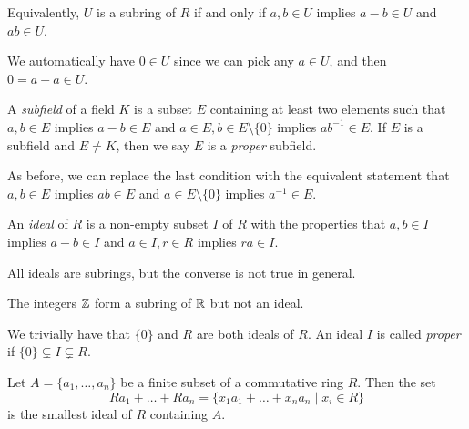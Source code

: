 \begin{remark}
  Equivalently, $U$ is a subring of $R$ if and only
  if $a, b \in U$ implies $a - b \in U$ and $ab \in U$.
\end{remark}

\begin{remark}
  We automatically have $0 \in U$ since we can pick
  any $a \in U$, and then $0 = a - a \in U$.
\end{remark}

\begin{definition}[Subfield]
  A \emph{subfield} of a field $K$ is a subset $E$
  containing at least two elements such that
  $a, b \in E$ implies $a - b \in E$ and $a \in E, b \in E \setminus \{0\}$ implies $ab^{-1} \in E$. If $E$ is
  a subfield and $E \ne K$, then we say $E$ is a
  \emph{proper} subfield.
\end{definition}

\begin{remark}
  As before, we can replace the last condition with
  the equivalent statement that
  $a, b \in E$ implies $ab \in E$ and
  $a \in E \setminus \{0\}$ implies $a^{-1} \in E$.
\end{remark}

\begin{definition}[Ideal]
  An \emph{ideal} of $R$ is a non-empty subset $I$ of
  $R$ with the properties that $a, b \in I$ implies
  $a - b \in I$ and $a \in I, r \in R$ implies $ra \in I$.
\end{definition}

\begin{remark}
  All ideals are subrings, but the converse is not
  true in general.
\end{remark}

\begin{example}
  The integers $\mathbb{Z}$ form a subring of $\mathbb{R}$ but not an
  ideal.
\end{example}

\begin{remark}
  We trivially have that $\{0\}$ and $R$ are both
  ideals of $R$. An ideal $I$ is called \emph{proper}
  if $\{0\} \subsetneq I \subsetneq R$.
\end{remark}

\begin{theorem}
  Let $A = \{a_1, \dots, a_n\}$ be a finite subset
  of a commutative ring $R$. Then the set
  \[Ra_1 + \dots + Ra_n = \{x_1 a_1 + \dots + x_n a_n \mid x_i \in R\}\]
  is the smallest ideal of $R$ containing $A$.
\end{theorem}

